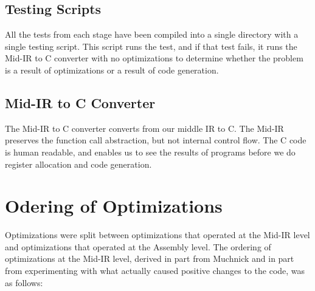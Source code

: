 \documentclass[11pt]{article}
\begin{document}
\subsection {Testing Scripts}

All the tests from each stage have been compiled into a single
directory with a single testing script. This script runs the test,
and if that test fails, it runs the Mid-IR to C converter with no
optimizations to determine whether the problem is a result of
optimizations or a result of code generation. 

\subsection {Mid-IR to C Converter} 

The Mid-IR to C converter converts from our middle IR to C. The Mid-IR
preserves the function call abstraction, but not internal control
flow. The C code is human readable, and enables us to see the results
of programs before we do register allocation and code generation.

\section {Odering of Optimizations} 
\label{sec:order}

Optimizations were split between optimizations that operated at the
Mid-IR level and optimizations that operated at the Assembly
level. The ordering of optimizations at the Mid-IR level, derived in
part from Muchnick and in part from experimenting with what actually
caused positive changes to the code, was as follows: 
\end{document}

